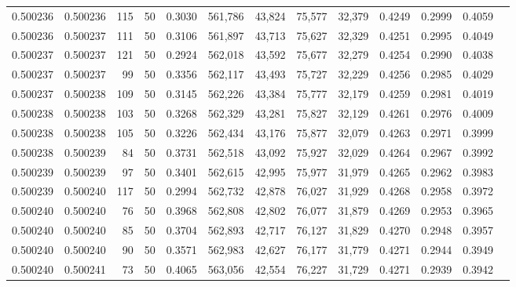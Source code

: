 \begin{tabular}{rrrrrrrrrrrrr}
0.500236 & 0.500236 &   115 &  50 &                                     0.3030 & 561,786 &  43,824 &  75,577 &  32,379 & 0.4249 & 0.2999 & 0.4059 \\
0.500236 & 0.500237 &   111 &  50 &                                     0.3106 & 561,897 &  43,713 &  75,627 &  32,329 & 0.4251 & 0.2995 & 0.4049 \\
0.500237 & 0.500237 &   121 &  50 &                                     0.2924 & 562,018 &  43,592 &  75,677 &  32,279 & 0.4254 & 0.2990 & 0.4038 \\
0.500237 & 0.500237 &    99 &  50 &                                     0.3356 & 562,117 &  43,493 &  75,727 &  32,229 & 0.4256 & 0.2985 & 0.4029 \\
0.500237 & 0.500238 &   109 &  50 &                                     0.3145 & 562,226 &  43,384 &  75,777 &  32,179 & 0.4259 & 0.2981 & 0.4019 \\
0.500238 & 0.500238 &   103 &  50 &                                     0.3268 & 562,329 &  43,281 &  75,827 &  32,129 & 0.4261 & 0.2976 & 0.4009 \\
0.500238 & 0.500238 &   105 &  50 &                                     0.3226 & 562,434 &  43,176 &  75,877 &  32,079 & 0.4263 & 0.2971 & 0.3999 \\
0.500238 & 0.500239 &    84 &  50 &                                     0.3731 & 562,518 &  43,092 &  75,927 &  32,029 & 0.4264 & 0.2967 & 0.3992 \\
0.500239 & 0.500239 &    97 &  50 &                                     0.3401 & 562,615 &  42,995 &  75,977 &  31,979 & 0.4265 & 0.2962 & 0.3983 \\
0.500239 & 0.500240 &   117 &  50 &                                     0.2994 & 562,732 &  42,878 &  76,027 &  31,929 & 0.4268 & 0.2958 & 0.3972 \\
0.500240 & 0.500240 &    76 &  50 &                                     0.3968 & 562,808 &  42,802 &  76,077 &  31,879 & 0.4269 & 0.2953 & 0.3965 \\
0.500240 & 0.500240 &    85 &  50 &                                     0.3704 & 562,893 &  42,717 &  76,127 &  31,829 & 0.4270 & 0.2948 & 0.3957 \\
0.500240 & 0.500240 &    90 &  50 &                                     0.3571 & 562,983 &  42,627 &  76,177 &  31,779 & 0.4271 & 0.2944 & 0.3949 \\
0.500240 & 0.500241 &    73 &  50 &                                     0.4065 & 563,056 &  42,554 &  76,227 &  31,729 & 0.4271 & 0.2939 & 0.3942 \\

\end{tabular}
